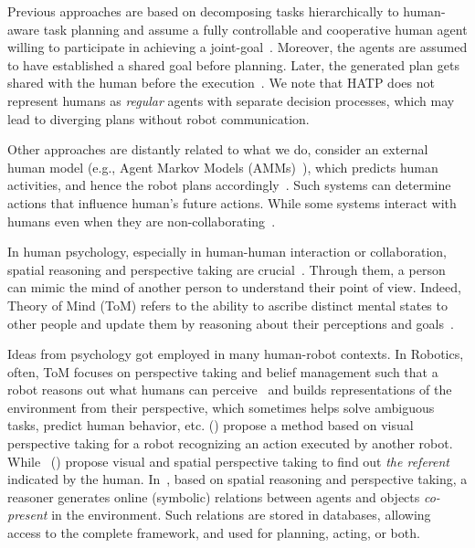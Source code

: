 \documentclass[letterpaper]{article} %
\begin{document}
Previous approaches are based on decomposing tasks hierarchically to human-aware task planning and assume a fully controllable and cooperative human agent willing to participate in achieving a joint-goal~\cite{alami2006toward,montreuil2007planning,alili2009planning,alili2009task,lallement2014hatp,de2015hatp,lallement2018hatp}. 
Moreover, the agents are assumed to have established a shared goal before planning. 
Later, the generated plan gets shared with the human before the execution~\cite{milliez2016using}.
We note that HATP does not represent humans as \textit{regular} agents with separate decision processes, which may lead to diverging plans without robot communication.

Other approaches are distantly related to what we do, consider an external human model (e.g., Agent Markov Models (AMMs)~\cite{unhelkar2020decision,UnhelkarLS19}), which predicts human activities, and hence the robot plans accordingly~\cite{hoffman2007effects,unhelkar2020decision,UnhelkarLS19}. Such systems can determine actions that influence human's future actions. While some systems interact with humans even when they are non-collaborating~\cite{buckingham2020robot}.

In human psychology, especially in human-human interaction or collaboration, spatial reasoning and perspective taking are crucial~\cite{flavell1992perspectives,tversky1999speakers}. Through them, a person can mimic the mind of another person to understand their point of view. Indeed, Theory of Mind (ToM) refers to the ability to ascribe distinct mental states to other people and update them by reasoning about their perceptions and goals~\cite{premack1978does,baron1985does}.

Ideas from psychology got employed in many human-robot contexts. In Robotics, often, ToM focuses on perspective taking and belief management such that a robot reasons out what humans can perceive~\cite{berlin2006perspective,milliez2014framework} and builds representations of the environment from their perspective, which sometimes helps solve ambiguous tasks, predict human behavior, etc.
\citeauthor{johnson2005perceptual} (\citeyear{johnson2005perceptual}) propose a method based on visual perspective taking for a robot recognizing an action executed by another robot. 
While~\citeauthor{milliez2014framework} (\citeyear{milliez2014framework}) propose visual and spatial perspective taking to find out {\em the referent} indicated by the human. 
In~\cite{Sisbot2011SituationAF}, based on spatial reasoning and perspective taking, a reasoner generates online (symbolic) relations between agents and objects {\em co-present} in the environment. 
Such relations are stored in databases, allowing access to the complete framework, and used for planning, acting, or both.
\end{document}
